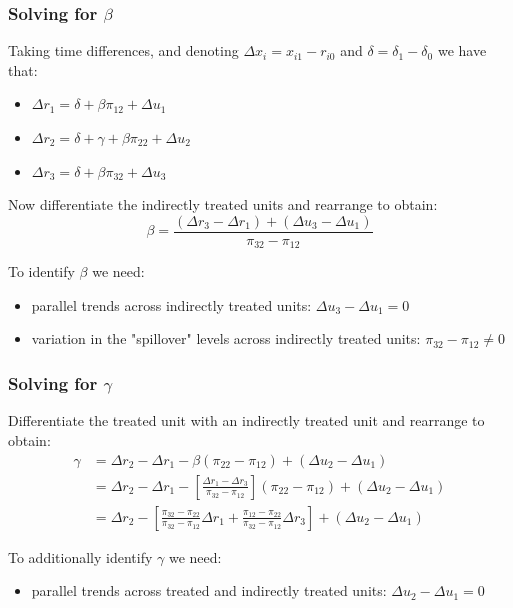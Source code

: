 \documentclass[aspectratio=169, t]{beamer}
\begin{document}
\begin{frame}
	\frametitle{Solving for $\beta$}

	Taking time differences, and denoting $\Delta x_i = x_{i1} - r_{i0}$ and $\delta = \delta_{1} - \delta_{0}$ we have that:

	\begin{itemize}
		\item $\Delta r_{1} = \delta + \beta\pi_{12} + \Delta u_{1}$
		\item $\Delta r_{2} = \delta + \gamma + \beta\pi_{22} + \Delta u_{2}$
		\item $\Delta r_{3} = \delta + \beta\pi_{32} + \Delta u_{3}$
	\end{itemize}

	\pause
	\vspace{2mm}

	Now differentiate the indirectly treated units and rearrange to obtain:
	\[
	\beta = \frac{(\Delta r_{3} - \Delta r_{1}) + (\Delta u_{3} - \Delta u_{1})}{\pi_{32} - \pi_{12}}
	\]

	\vspace{2mm}
	To identify $\beta$ we need:
	\begin{itemize}
		\item parallel trends across indirectly treated units: $\Delta u_{3} - \Delta u_{1} = 0$
		\item variation in the "spillover" levels across indirectly treated units:  $\pi_{32} - \pi_{12} \neq 0$
	\end{itemize}
\end{frame}

\begin{frame}
	\frametitle{Solving for $\gamma$}

	Differentiate the treated unit with an indirectly treated unit and rearrange to obtain:
	\[
	\begin{split}\gamma & = \Delta r_{2} - \Delta r_{1} - \beta(\pi_{22} - \pi_{12}) + (\Delta u_{2} - \Delta u_{1}) \\
	& = \Delta r_{2} - \Delta r_{1} - \left[\frac{\Delta r_{1} - \Delta r_{3}}{\pi_{32} - \pi_{12}}\right](\pi_{22} - \pi_{12}) + (\Delta u_{2} - \Delta u_{1}) \\
	& = \Delta r_{2} - \left[\frac{\pi_{32} - \pi_{22}}{\pi_{32} - \pi_{12}}\Delta r_{1} + \frac{\pi_{12} - 
	\pi_{22}}{\pi_{32} - \pi_{12}}\Delta r_{3}\right] + (\Delta u_{2} - \Delta u_{1})
	\end{split}
	\]

	\vspace{2mm}
	To additionally identify $\gamma$ we need:
	\begin{itemize}
		\item parallel trends across treated and indirectly treated units: $\Delta u_{2} - \Delta u_{1} = 0$
	\end{itemize}
\end{frame}
\end{document}
